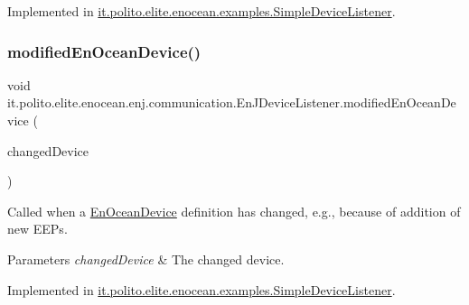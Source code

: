 Implemented in \hyperlink{classit_1_1polito_1_1elite_1_1enocean_1_1examples_1_1_simple_device_listener_ac45863a003b12605520086f7d3e9b5d9}{it.\+polito.\+elite.\+enocean.\+examples.\+Simple\+Device\+Listener}.

\hypertarget{interfaceit_1_1polito_1_1elite_1_1enocean_1_1enj_1_1communication_1_1_en_j_device_listener_a90117812e489a4b4b7d9da1249e6ab90}{}\label{interfaceit_1_1polito_1_1elite_1_1enocean_1_1enj_1_1communication_1_1_en_j_device_listener_a90117812e489a4b4b7d9da1249e6ab90} 
\subsubsection{\texorpdfstring{modified\+En\+Ocean\+Device()}{modifiedEnOceanDevice()}}
{\footnotesize\ttfamily void it.\+polito.\+elite.\+enocean.\+enj.\+communication.\+En\+J\+Device\+Listener.\+modified\+En\+Ocean\+Device (\begin{DoxyParamCaption}\item[{\hyperlink{classit_1_1polito_1_1elite_1_1enocean_1_1enj_1_1model_1_1_en_ocean_device}{En\+Ocean\+Device}}]{changed\+Device }\end{DoxyParamCaption})}

Called when a \hyperlink{}{En\+Ocean\+Device} definition has changed, e.\+g., because of addition of new E\+E\+Ps.


\begin{DoxyParams}{Parameters}
{\em changed\+Device} & The changed device. \\
\hline
\end{DoxyParams}


Implemented in \hyperlink{classit_1_1polito_1_1elite_1_1enocean_1_1examples_1_1_simple_device_listener_af8ecaa5dd2d0fcb5907d939d7428eb5d}{it.\+polito.\+elite.\+enocean.\+examples.\+Simple\+Device\+Listener}.

\hypertarget{interfaceit_1_1polito_1_1elite_1_1enocean_1_1enj_1_1communication_1_1_en_j_device_listener_aca9114b95c51e8a4afaa4240dddf0a7d}{}\label{interfaceit_1_1polito_1_1elite_1_1enocean_1_1enj_1_1communication_1_1_en_j_device_listener_aca9114b95c51e8a4afaa4240dddf0a7d} 
